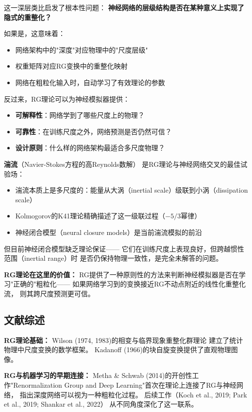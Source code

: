 \documentclass[12pt,a4paper,twoside]{article}
\begin{document}
\begin{inversation}
这一深层类比启发了根本性问题：
\textbf{神经网络的层级结构是否在某种意义上实现了隐式的重整化？}

如果是，这意味着：
\begin{itemize}
    \item 网络架构中的"深度"对应物理中的"尺度层级"
    \item 权重矩阵对应RG变换中的重整化映射
    \item 网络在粗粒化输入时，自动学习了有效理论的参数
\end{itemize}

反过来，RG理论可以为神经模拟器提供：
\begin{itemize}
    \item \textbf{可解释性}：网络学到了哪些尺度上的物理？
    \item \textbf{可靠性}：在训练尺度之外，网络预测是否仍然可信？
    \item \textbf{设计原则}：什么样的网络架构最适合多尺度物理？
\end{itemize}

\textbf{湍流}（Navier-Stokes方程的高Reynolds数解）
是RG理论与神经网络交叉的最佳试验场：
\begin{itemize}
    \item 湍流本质上是多尺度的：能量从大涡（inertial scale）级联到小涡（dissipation scale）
    \item Kolmogorov的K41理论精确描述了这一级联过程（$-5/3$幂律）
    \item 神经闭合模型（neural closure models）是当前湍流模拟的前沿
\end{itemize}

但目前神经闭合模型缺乏理论保证——
它们在训练尺度上表现良好，但跨越惯性范围（inertial range）时
是否仍保持物理一致性，是完全未解答的问题。

\textbf{RG理论在这里的价值：}
RG提供了一种原则性的方法来判断神经模拟器是否在学习"正确的"粗粒化——
如果网络学习到的变换接近RG不动点附近的线性化重整化流，
则其跨尺度预测更可信。

\subsection{文献综述}

\textbf{RG理论基础：} Wilson (1974, 1983)的相变与临界现象重整化群理论
建立了统计物理中尺度变换的数学框架。
Kadanoff (1966)的块自旋变换提供了直观物理图像。

\textbf{RG与机器学习的早期连接：}
Metha \& Schwab (2014)的开创性工作"Renormalization Group and
Deep Learning"首次在理论上连接了RG与神经网络，
指出深度网络可以视为一种粗粒化过程。
后续工作（Koch et al., 2019; Park et al., 2019; Shankar et al., 2022）
从不同角度深化了这一联系。


\end{inversation}
\end{document}
